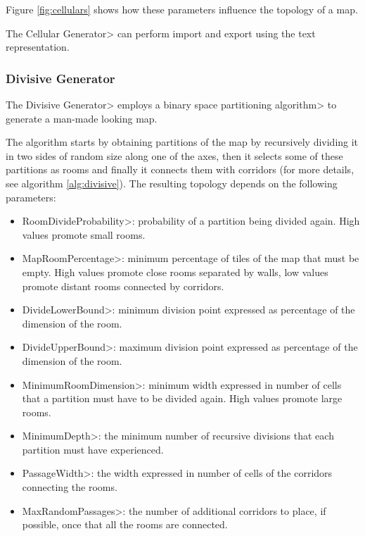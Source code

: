 \noindent Figure \ref{fig:cellulars} shows how these parameters influence the topology of a map.

\par

The \<Cellular Generator> can perform import and export using the text representation.


\subsubsection{Divisive Generator}\label{sssec:digger}

The \<Divisive Generator> employs a \<binary space partitioning algorithm> to generate a man-made looking map.

\par

The algorithm starts by obtaining partitions of the map by recursively dividing it in two sides of random size along one of the axes, then it selects some of these partitions as rooms and finally it connects them with corridors (for more details, see algorithm \ref{alg:divisive}). The resulting topology depends on the following parameters:

\begin{itemize}
\item \<RoomDivideProbability>: probability of a partition being divided again. High values promote small rooms.
\item \<MapRoomPercentage>: minimum percentage of tiles of the map that must be empty. High values promote close rooms separated by walls, low values promote distant rooms connected by corridors.
\item \<DivideLowerBound>: minimum division point expressed as percentage of the dimension of the room.
\item \<DivideUpperBound>: maximum division point expressed as percentage of the dimension of the room.
\item \<MinimumRoomDimension>: minimum width expressed in number of cells that a partition must have to be divided again. High values promote large rooms.
\item \<MinimumDepth>: the minimum number of recursive divisions that each partition must have experienced.
\item \<PassageWidth>: the width expressed in number of cells of the corridors connecting the rooms.
\item \<MaxRandomPassages>: the number of additional corridors to place, if possible, once that all the rooms are connected.
\end{itemize}

